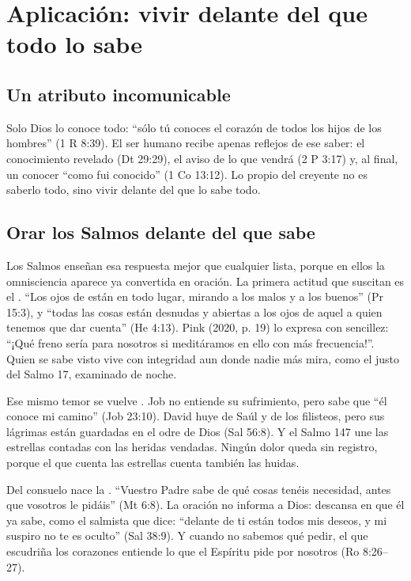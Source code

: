 
\section{Aplicación: vivir delante del que todo lo sabe}

\subsection{Un atributo incomunicable}
Solo Dios lo conoce todo: ``sólo tú conoces el corazón de todos los hijos de los hombres'' (1 R 8:39). El ser humano recibe apenas reflejos de ese saber: el conocimiento revelado (Dt 29:29), el aviso de lo que vendrá (2 P 3:17) y, al final, un conocer ``como fui conocido'' (1 Co 13:12). Lo propio del creyente no es saberlo todo, sino vivir delante del que lo sabe todo.


\subsection{Orar los Salmos delante del que sabe}
Los Salmos enseñan esa respuesta mejor que cualquier lista, porque en ellos la omnisciencia aparece ya convertida en oración. La primera actitud que suscitan es el . ``Los ojos de \SENOR{} están en todo lugar, mirando a los malos y a los buenos'' (Pr 15:3), y ``todas las cosas están desnudas y abiertas a los ojos de aquel a quien tenemos que dar cuenta'' (He 4:13). Pink (2020, p. 19) lo expresa con sencillez: ``¡Qué freno sería para nosotros si meditáramos en ello con más frecuencia!''. Quien se sabe visto vive con integridad aun donde nadie más mira, como el justo del Salmo 17, examinado de noche.

Ese mismo temor se vuelve . Job no entiende su sufrimiento, pero sabe que ``él conoce mi camino'' (Job 23:10). David huye de Saúl y de los filisteos, pero sus lágrimas están guardadas en el odre de Dios (Sal 56:8). Y el Salmo 147 une las estrellas contadas con las heridas vendadas. Ningún dolor queda sin registro, porque el que cuenta las estrellas cuenta también las huidas.

Del consuelo nace la . ``Vuestro Padre sabe de qué cosas tenéis necesidad, antes que vosotros le pidáis'' (Mt 6:8). La oración no informa a Dios: descansa en que él ya sabe, como el salmista que dice: ``delante de ti están todos mis deseos, y mi suspiro no te es oculto'' (Sal 38:9). Y cuando no sabemos qué pedir, el que escudriña los corazones entiende lo que el Espíritu pide por nosotros (Ro 8:26--27).

